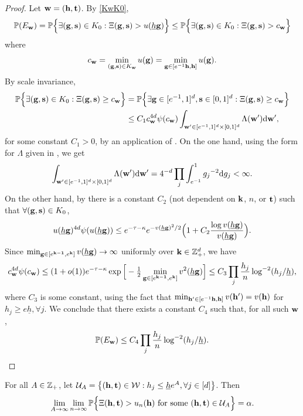 \documentclass[twoside,11pt]{article}
\begin{document}
\begin{proof}
Let $\mathbf{w} = (\mathbf{h}, \mathbf{t})$.  By \eqref{KwK0},
\[
\mathbb{P}(E_{\mathbf{w}}) = \mathbb{P} \Big\{ \exists (\mathbf{g},\mathbf{s}) \in K_0 : \Xi(\mathbf{g},\mathbf{s}) > u(\underline h \mathbf{g}) \Big\} \le \mathbb{P} \Big\{ \exists (\mathbf{g},\mathbf{s}) \in K_0 : \Xi(\mathbf{g},\mathbf{s}) > c_{\mathbf{w}} \Big\}
\]
where
\[
c_{\mathbf{w}} = \min_{(\mathbf{g},\mathbf{s}) \in K_{\mathbf{w}}} u(\mathbf{g}) = \min_{\mathbf{g} \in [e^{-1} \mathbf{h}, \mathbf{h}]} u(\mathbf{g}).
\]
By scale invariance, 
\[\begin{split}
\mathbb{P} \Big\{ \exists (\mathbf{g},\mathbf{s}) \in K_0 : \Xi(\mathbf{g},\mathbf{s}) \ge c_{\mathbf{w}} \Big\}
&= \mathbb{P} \Big\{ \exists \mathbf{g} \in [e^{-1},1]^d, \mathbf{s} \in [0,1]^d : \Xi(\mathbf{g},\mathbf{s}) \ge c_{\mathbf{w}} \Big\} \\
&\le C_1 c_{\mathbf{w}}^{4d} \psi(c_{\mathbf{w}}) \int_{\mathbf{w}' \in [e^{-1},1]^d \times [0,1]^d} \Lambda(\mathbf{w}') {\rm d} \mathbf{w}',
\end{split}\]
for some constant $C_1 > 0$, by an application of .
On the one hand, using the form for $\Lambda$ given in , we get
\[
\int_{\mathbf{w}' \in [e^{-1},1]^d \times [0,1]^d} \Lambda(\mathbf{w}') {\rm d} \mathbf{w}' = 4^{-d} \prod_j \int_{e^{-1}}^1 {g_j}^{-2} {\rm d}g_j < \infty.
\]
On the other hand, by  there is a constant $C_2$ (not dependent on $\mathbf{k}$, $n$, or $\mathbf{t}$) such that $\forall (\mathbf{g},\mathbf{s}) \in K_0$,
\[
u(\underline h \mathbf{g})^{4d} \psi(u(\underline h \mathbf{g})) \le e^{-\tau - \kappa} e^{-v(\underline h \mathbf{g})^2/2} \Big(1 + C_2 \frac{\log v(\underline h \mathbf{g})}{v(\underline h \mathbf{g})}\Big).
\]
Since $\min_{\mathbf{g} \in [e^{\mathbf{k} - {\bf 1}}, e^{\mathbf{k}}]} v(\underline h \mathbf{g}) \to \infty$ uniformly over $\mathbf{k} \in \mathbb{Z}_+^d$, we have 
\[
c_{\mathbf{w}}^{4d} \psi(c_{\mathbf{w}}) \le (1+o(1)) e^{-\tau-\kappa} \exp\Big[- \tfrac12 \min_{\mathbf{g} \in [e^{\mathbf{k} - {\bf 1}}, e^{\mathbf{k}} ]} v^2(\underline h \mathbf{g})\Big] \le C_3 \prod_j \frac{h_j}{n} \log^{-2}(h_j/\underline h),
\]
where $C_3$ is some constant, using the fact that $\min_{\mathbf{h}' \in [e^{-1} \mathbf{h},\mathbf{h}]} v(\mathbf{h}') = v(\mathbf{h})$ for $h_j \ge e \underline h, \forall j$.
We conclude that there exists a constant $C_4$ such that, for all such $\mathbf{w}$,
\[
\mathbb{P}(E_{\mathbf{w}}) \le C_4 \prod_j \frac{h_j}{n} \log^{-2}(h_j/\underline h).
\]
\end{proof}

\begin{lemma}
\label{lem:low_scale_adascan}
For all $A \in \mathbb{Z}_+$, let $\mathcal{U}_A = \big\{ (\mathbf{h}, \mathbf{t}) \in \mathcal{W} : h_j \le \underline h e^A, \forall j \in [d] \big\}$.
Then 
\[
\lim_{A \rightarrow \infty} \lim_{n \rightarrow \infty} \mathbb{P} \Big\{ \Xi(\mathbf{h},\mathbf{t}) > u_n(\mathbf{h}) \textrm{ for some } (\mathbf{h},\mathbf{t}) \in \mathcal{U}_A \Big\} = \alpha.
\]
\end{lemma}
\end{document}
